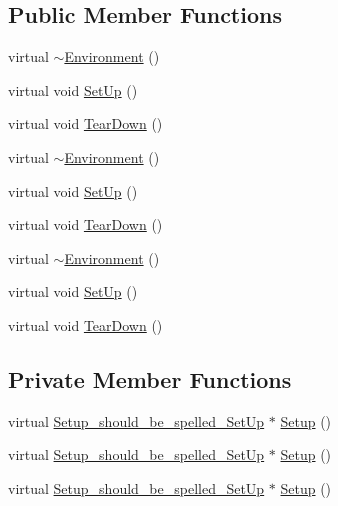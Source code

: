 \subsection*{Public Member Functions}
\begin{DoxyCompactItemize}
\item 
virtual \mbox{\hyperlink{classtesting_1_1_environment_a0e41c320362576d752cd1f44cabd57d4}{$\sim$\+Environment}} ()
\item 
virtual void \mbox{\hyperlink{classtesting_1_1_environment_a1bf8cafaa9d4eba9feb98655ee434eb3}{Set\+Up}} ()
\item 
virtual void \mbox{\hyperlink{classtesting_1_1_environment_a039bdaa705c46b9b88234cf4d3bb6254}{Tear\+Down}} ()
\item 
virtual \mbox{\hyperlink{classtesting_1_1_environment_a0e41c320362576d752cd1f44cabd57d4}{$\sim$\+Environment}} ()
\item 
virtual void \mbox{\hyperlink{classtesting_1_1_environment_a1bf8cafaa9d4eba9feb98655ee434eb3}{Set\+Up}} ()
\item 
virtual void \mbox{\hyperlink{classtesting_1_1_environment_a039bdaa705c46b9b88234cf4d3bb6254}{Tear\+Down}} ()
\item 
virtual \mbox{\hyperlink{classtesting_1_1_environment_a0e41c320362576d752cd1f44cabd57d4}{$\sim$\+Environment}} ()
\item 
virtual void \mbox{\hyperlink{classtesting_1_1_environment_a1bf8cafaa9d4eba9feb98655ee434eb3}{Set\+Up}} ()
\item 
virtual void \mbox{\hyperlink{classtesting_1_1_environment_a039bdaa705c46b9b88234cf4d3bb6254}{Tear\+Down}} ()
\end{DoxyCompactItemize}
\subsection*{Private Member Functions}
\begin{DoxyCompactItemize}
\item 
virtual \mbox{\hyperlink{structtesting_1_1_environment_1_1_setup__should__be__spelled___set_up}{Setup\+\_\+should\+\_\+be\+\_\+spelled\+\_\+\+Set\+Up}} $\ast$ \mbox{\hyperlink{classtesting_1_1_environment_a6096a69b03f6eb727a69a39f854cc87b}{Setup}} ()
\item 
virtual \mbox{\hyperlink{structtesting_1_1_environment_1_1_setup__should__be__spelled___set_up}{Setup\+\_\+should\+\_\+be\+\_\+spelled\+\_\+\+Set\+Up}} $\ast$ \mbox{\hyperlink{classtesting_1_1_environment_a6096a69b03f6eb727a69a39f854cc87b}{Setup}} ()
\item 
virtual \mbox{\hyperlink{structtesting_1_1_environment_1_1_setup__should__be__spelled___set_up}{Setup\+\_\+should\+\_\+be\+\_\+spelled\+\_\+\+Set\+Up}} $\ast$ \mbox{\hyperlink{classtesting_1_1_environment_a6096a69b03f6eb727a69a39f854cc87b}{Setup}} ()
\end{DoxyCompactItemize}


